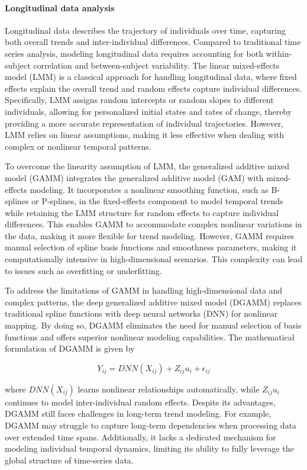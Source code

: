 \documentclass[acmsmall]{acmart}
\begin{document}
\paragraph{Longitudinal data analysis} Longitudinal data describes the trajectory of individuals over time, capturing both overall trends and inter-individual differences. Compared to traditional time series analysis, modeling longitudinal data requires accounting for both within-subject correlation and between-subject variability. The linear mixed-effects model (LMM) is a classical approach for handling longitudinal data, where fixed effects explain the overall trend and random effects capture individual differences. Specifically, LMM assigns random intercepts or random slopes to different individuals, allowing for personalized initial states and rates of change, thereby providing a more accurate representation of individual trajectories. However, LMM relies on linear assumptions, making it less effective when dealing with complex or nonlinear temporal patterns.  

To overcome the linearity assumption of LMM, the generalized additive mixed model (GAMM) integrates the generalized additive model (GAM) with mixed-effects modeling. It incorporates a nonlinear smoothing function, such as B-splines or P-splines, in the fixed-effects component to model temporal trends while retaining the LMM structure for random effects to capture individual differences. This enables GAMM to accommodate complex nonlinear variations in the data, making it more flexible for trend modeling. However, GAMM requires manual selection of spline basis functions and smoothness parameters, making it computationally intensive in high-dimensional scenarios. This complexity can lead to issues such as overfitting or underfitting.  

To address the limitations of GAMM in handling high-dimensional data and complex patterns, the deep generalized additive mixed model (DGAMM) replaces traditional spline functions with deep neural networks (DNN) for nonlinear mapping. By doing so, DGAMM eliminates the need for manual selection of basis functions and offers superior nonlinear modeling capabilities. The mathematical formulation of DGAMM is given by  

\[
Y_{ij} = DNN(X_{ij}) + Z_{ij} u_i + \epsilon_{ij}
\]

where \(DNN(X_{ij})\) learns nonlinear relationships automatically, while \(Z_{ij} u_i\) continues to model inter-individual random effects. Despite its advantages, DGAMM still faces challenges in long-term trend modeling. For example, DGAMM may struggle to capture long-term dependencies when processing data over extended time spans. Additionally, it lacks a dedicated mechanism for modeling individual temporal dynamics, limiting its ability to fully leverage the global structure of time-series data.  
\end{document}
